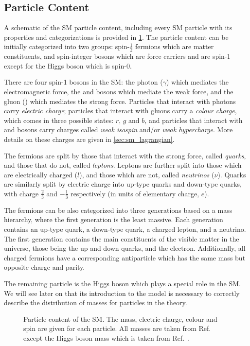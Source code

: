 \subsection{Particle Content}
A schematic of the SM particle content, including every SM particle with its properties and categorizations is provided in \cref{fig:sm_particle_content}. The particle content can be initially categorized into two groups: spin-$\frac{1}{2}$ fermions which are matter constituents, and spin-integer bosons which are force carriers and are spin-1 except for the Higgs boson which is spin-0. 

There are four spin-1 bosons in the SM: the photon ($\gamma$) which mediates the electromagnetic force, the \PWpm and \PZ bosons which mediate the weak force, and the gluon (\Pg) which mediates the strong force. Particles that interact with photons carry \textit{electric charge}; particles that interact with gluons carry a \textit{colour charge}, which comes in three possible states: $r$, $g$ and $b$, and particles that interact with \PWpm and \PZ bosons carry charges called \textit{weak isospin} and/or \textit{weak hypercharge}. More details on these charges are given in \cref{sec:sm_lagrangian}.

The fermions are split by those that interact with the strong force, called \textit{quarks}, and those that do not, called \textit{leptons}. Leptons are further split into those which are electrically charged ($l$), and those which are not, called \textit{neutrinos} ($\nu$).  Quarks are similarly split by electric charge into up-type quarks and down-type quarks, with charge $\frac{2}{3}$ and $-\frac{1}{3}$ respectively (in units of elementary charge, $e$). 

The fermions can be also categorized into three generations based on a mass hierarchy, where the first generation is the least massive. Each generation contains an up-type quark, a down-type quark, a charged lepton, and a neutrino. The first generation contains the main constituents of the visible matter in the universe, those being the up and down quarks, and the electron. Additionally, all charged fermions have a corresponding antiparticle which has the same mass but opposite charge and parity.

The remaining particle is the Higgs boson which plays a special role in the SM. We will see later on that its introduction to the model is necessary to correctly describe the distribution of masses for particles in the theory. 

\begin{figure}
  \centering
  \hbox{\hspace{-2.5cm}}
  \caption[SM Particle Content]{Particle content of the SM. The mass, electric charge, colour and spin are given for each particle. All masses are taken from Ref.~\cite{ParticleDataGroup:2020ssz} except the Higgs boson mass which is taken from Ref.~\cite{CMS:2020xrn}.}\label{fig:sm_particle_content}
\end{figure}